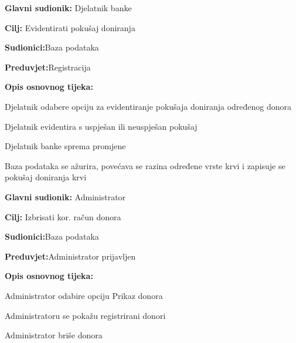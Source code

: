 \noindent {}
\begin{packed_item}
	
	\item \textbf{Glavni sudionik: }{Djelatnik banke}
	\item  \textbf{Cilj:} {Evidentirati pokušaj doniranja}
	\item  \textbf{Sudionici:}{Baza podataka} 
	\item  \textbf{Preduvjet:}{Registracija}
	\item  \textbf{Opis osnovnog tijeka:}
	
	\item[] \begin{packed_enum}
		
		\item {Djelatnik odabere opciju za evidentiranje pokušaja doniranja određenog donora}
		\item {Djelatnik evidentira s uspješan ili neuspješan pokušaj}
		\item {Djelatnik banke sprema promjene}
		\item {Baza podataka se ažurira, povećava se razina određene vrste krvi i zapisuje se pokušaj doniranja krvi}
		
	\end{packed_enum}
	
\end{packed_item}
\eject 
\noindent {}
\begin{packed_item}
	
	\item \textbf{Glavni sudionik: }{Administrator}
	\item  \textbf{Cilj:} {Izbrisati kor. račun donora}
	\item  \textbf{Sudionici:}{Baza podataka}
	\item  \textbf{Preduvjet:}{Administrator prijavljen}
	\item  \textbf{Opis osnovnog tijeka:}
	
	\item[] \begin{packed_enum}
		
		\item {Administrator odabire opciju Prikaz donora}
		\item {Administratoru se pokažu registrirani donori} 
		\item {Administrator briše donora}
		
	\end{packed_enum}
	
\end{packed_item}

